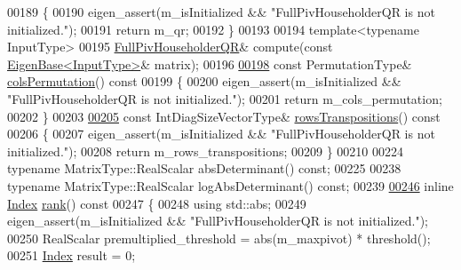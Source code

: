 \begin{DoxyCode}
00189 \textcolor{keyword}{    }\{
00190       eigen\_assert(m\_isInitialized && \textcolor{stringliteral}{"FullPivHouseholderQR is not initialized."});
00191       \textcolor{keywordflow}{return} m\_qr;
00192     \}
00193 
00194     \textcolor{keyword}{template}<\textcolor{keyword}{typename} InputType>
00195     \hyperlink{group___q_r___module_class_eigen_1_1_full_piv_householder_q_r}{FullPivHouseholderQR}& compute(\textcolor{keyword}{const} \hyperlink{group___core___module_struct_eigen_1_1_eigen_base}{EigenBase<InputType>}& 
      matrix);
00196 
\hyperlink{group___q_r___module_abeda6d91e196c13d4dd8b7542fef3e17}{00198}     \textcolor{keyword}{const} PermutationType& \hyperlink{group___q_r___module_abeda6d91e196c13d4dd8b7542fef3e17}{colsPermutation}()\textcolor{keyword}{ const}
00199 \textcolor{keyword}{    }\{
00200       eigen\_assert(m\_isInitialized && \textcolor{stringliteral}{"FullPivHouseholderQR is not initialized."});
00201       \textcolor{keywordflow}{return} m\_cols\_permutation;
00202     \}
00203 
\hyperlink{group___q_r___module_abebbfc0ca6e3dd285a0ad0c907abb093}{00205}     \textcolor{keyword}{const} IntDiagSizeVectorType& \hyperlink{group___q_r___module_abebbfc0ca6e3dd285a0ad0c907abb093}{rowsTranspositions}()\textcolor{keyword}{ const}
00206 \textcolor{keyword}{    }\{
00207       eigen\_assert(m\_isInitialized && \textcolor{stringliteral}{"FullPivHouseholderQR is not initialized."});
00208       \textcolor{keywordflow}{return} m\_rows\_transpositions;
00209     \}
00210 
00224     \textcolor{keyword}{typename} MatrixType::RealScalar absDeterminant() \textcolor{keyword}{const};
00225 
00238     \textcolor{keyword}{typename} MatrixType::RealScalar logAbsDeterminant() \textcolor{keyword}{const};
00239 
\hyperlink{group___q_r___module_aeae555220f46477818ccc94aca2de770}{00246}     \textcolor{keyword}{inline} \hyperlink{namespace_eigen_a62e77e0933482dafde8fe197d9a2cfde}{Index} \hyperlink{group___q_r___module_aeae555220f46477818ccc94aca2de770}{rank}()\textcolor{keyword}{ const}
00247 \textcolor{keyword}{    }\{
00248       \textcolor{keyword}{using} std::abs;
00249       eigen\_assert(m\_isInitialized && \textcolor{stringliteral}{"FullPivHouseholderQR is not initialized."});
00250       RealScalar premultiplied\_threshold = abs(m\_maxpivot) * threshold();
00251       \hyperlink{namespace_eigen_a62e77e0933482dafde8fe197d9a2cfde}{Index} result = 0;

\end{DoxyCode}
